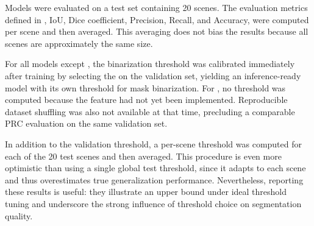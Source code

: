 {\begin{table}[h!]
\centering
\renewcommand{\arraystretch}{1.3}
\caption{Model properties and deployment metrics.}
\label{tab:model_comparison}
\end{table}

Models were evaluated on a test set containing 20 scenes.
The evaluation metrics defined in , IoU, Dice coefficient, Precision, Recall,
and Accuracy, were computed per scene and then averaged. This averaging does not bias the results because all scenes are approximately the same size.

For all models except , the binarization threshold was calibrated immediately after training by selecting the  on the validation set,
yielding an inference-ready model with its own threshold for mask binarization. For , no threshold was computed because the feature had not yet been implemented.
Reproducible dataset shuffling was also not available at that time, precluding a comparable PRC evaluation on the same validation set.

In addition to the validation threshold, a per-scene threshold was computed for each of the 20 test scenes and then averaged.
This procedure is even more optimistic than using a single global test threshold, since it adapts to each scene and thus overestimates true generalization performance.
Nevertheless, reporting these results is useful:
they illustrate an upper bound under ideal threshold tuning and underscore the strong influence of threshold choice on segmentation quality.

}
